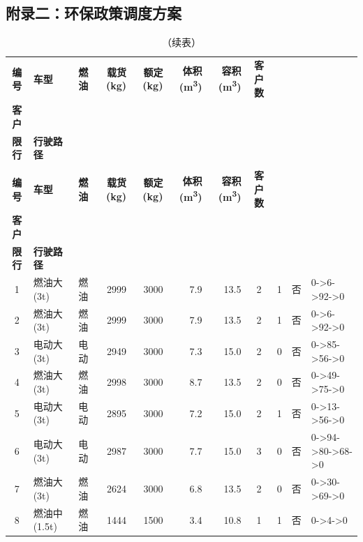 
\begin{landscape}
\section{附录二：环保政策调度方案}
\scriptsize
\setlength{\tabcolsep}{3pt}
\begin{longtable}{|c|l|c|r|r|r|r|c|c|c|p{2.8cm}|}
\caption{问题二完整调度方案（基本信息，共163辆次）} \\
\hline
\rowcolor{gray!25}
\textbf{编号} & \textbf{车型} & \textbf{燃油} & \textbf{载货(kg)} & \textbf{额定(kg)} & \textbf{体积(m\textsuperscript{3})} & \textbf{容积(m\textsuperscript{3})} & \textbf{客户数} & \makecell{\textbf{绿色区}\\\textbf{客户}} & \makecell{\textbf{违反}\\\textbf{限行}} & \textbf{行驶路径} \\
\hline
\endfirsthead
\caption[]{（续表）} \\
\hline
\rowcolor{gray!25}
\textbf{编号} & \textbf{车型} & \textbf{燃油} & \textbf{载货(kg)} & \textbf{额定(kg)} & \textbf{体积(m\textsuperscript{3})} & \textbf{容积(m\textsuperscript{3})} & \textbf{客户数} & \makecell{\textbf{绿色区}\\\textbf{客户}} & \makecell{\textbf{违反}\\\textbf{限行}} & \textbf{行驶路径} \\
\hline
\endhead
\hline \endfoot
\hline \endlastfoot
\rowcolor{gray!8}
1 & 燃油大(3t) & 燃油 & 2999 & 3000 & 7.9 & 13.5 & 2 & 1 & 否 & 0->6->92->0 \\
\hline
2 & 燃油大(3t) & 燃油 & 2999 & 3000 & 7.9 & 13.5 & 2 & 1 & 否 & 0->6->92->0 \\
\hline
\rowcolor{gray!8}
3 & 电动大(3t) & 电动 & 2949 & 3000 & 7.3 & 15.0 & 2 & 0 & 否 & 0->85->56->0 \\
\hline
4 & 燃油大(3t) & 燃油 & 2998 & 3000 & 8.7 & 13.5 & 2 & 0 & 否 & 0->49->75->0 \\
\hline
\rowcolor{gray!8}
5 & 电动大(3t) & 电动 & 2895 & 3000 & 7.2 & 15.0 & 2 & 1 & 否 & 0->13->56->0 \\
\hline
6 & 电动大(3t) & 电动 & 2987 & 3000 & 7.7 & 15.0 & 3 & 0 & 否 & 0->94->80->68->0 \\
\hline
\rowcolor{gray!8}
7 & 燃油大(3t) & 燃油 & 2624 & 3000 & 6.8 & 13.5 & 2 & 0 & 否 & 0->30->69->0 \\
\hline
8 & 燃油中(1.5t) & 燃油 & 1444 & 1500 & 3.4 & 10.8 & 1 & 1 & 否 & 0->4->0 \\

\end{longtable}
\end{landscape}
